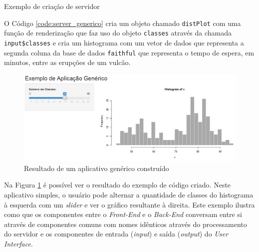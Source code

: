 \documentclass[12pt,openright,oneside,a4paper,english,french,spanish]{abntex2}
\numberwithin{table}{section} %
\numberwithin{figure}{section} %
\begin{document}
\begin{rcode}
\begin{Schunk}
\end{Schunk}
\caption{Exemplo de criação de servidor}
\label{code:server_generico}
\end{rcode}

O Código \ref{code:server_generico} cria um objeto chamado \texttt{distPlot} com uma função de renderização que faz uso do objeto \texttt{classes} através da chamada \texttt{input\$classes} e cria um histograma com um vetor de dados que representa a segunda coluna da base de dados \texttt{faithful} que representa o tempo de espera, em minutos, entre as erupções de um vulcão.

\begin{figure}[H]
\centering
\includegraphics{shiny_generico.png}
\caption{Resultado de um aplicativo genérico construído}
\label{fig:shiny_example_generico}
\end{figure}

Na Figura \ref{fig:shiny_example_generico} é possível ver o resultado do exemplo de código criado. Neste aplicativo simples, o usuário pode alternar a quantidade de classes do histograma à esquerda com um \textit{slider} e ver o gráfico resultante à direita. Este exemplo ilustra como que os componentes entre o \textit{Front-End} e o \textit{Back-End} conversam entre si através de componentes comuns com nomes idênticos através do processamento do servidor e os componentes de entrada (\textit{input}) e saída (\textit{output}) do \textit{User Interface}.
\end{document}
